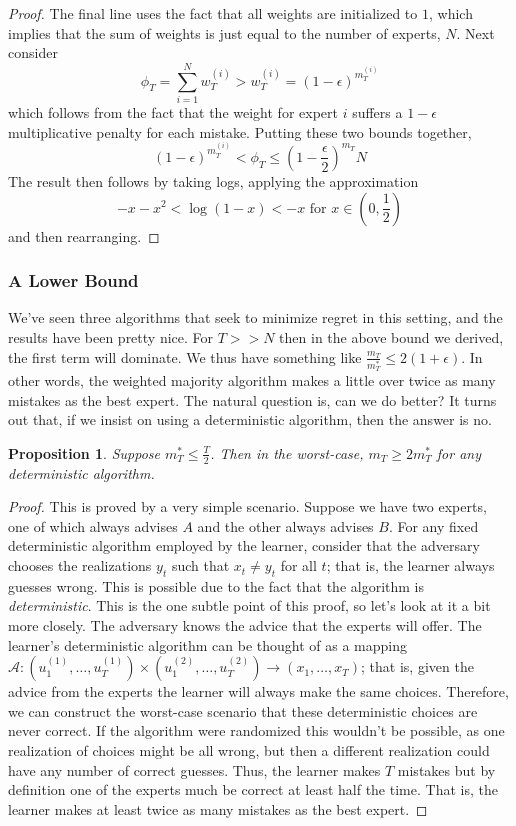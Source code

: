 \documentclass[12pt]{article}
\newtheorem{prop}{Proposition}
\begin{document}
\begin{proof}
The final line uses the fact that all weights are initialized to $1$, which implies that the sum of weights is
just equal to the number of experts, $N$. Next consider
\[\phi_T = \sum_{i = 1}^{N} w_T^{(i)} > w_T^{(i)} = (1 - \epsilon)^{m_T^{(i)}}\]
which follows from the fact that the weight for expert $i$ suffers a $1 - \epsilon$ multiplicative penalty for each mistake. Putting these two bounds together, 
\[(1 - \epsilon)^{m_T^{(i)}} < \phi_T \leq \left(1 - \frac{\epsilon}{2}\right)^{m_T}N\]
The result then follows by taking logs, applying the approximation 
\[-x - x^2 < \log(1 - x) < -x \text{ for } x \in \left(0, \frac{1}{2}\right)\]
and then rearranging. 
\end{proof}

\subsubsection{A Lower Bound}
We've seen three algorithms that seek to minimize regret in this setting, and the results have been pretty nice. For $T >> N$ then in the above bound we derived, the first term will dominate. We thus have 
something like $\frac{m_T}{m_T^*} \leq 2(1 + \epsilon)$. In other words, the weighted majority algorithm makes a little over twice as many mistakes as the best expert.
The natural question is, can we do better? It turns out that, if we insist on using a deterministic algorithm, then the answer is no. 
\begin{prop}
Suppose $m_T^* \leq \frac{T}{2}$. Then in the worst-case, $m_T \geq 2m_T^*$ for any deterministic algorithm. 
\end{prop} 

\begin{proof}
This is proved by a very simple scenario. Suppose we have two experts, one of which always advises $A$ and the other always advises $B$. For any fixed deterministic algorithm employed by the 
learner, consider that the adversary chooses the realizations $y_t$ such that $x_t \neq y_t$ for all $t$; that is, the learner always guesses wrong. This is possible due to the fact that the algorithm
is \textit{deterministic}. This is the one subtle point of this proof, so let's look at it a bit more closely. The adversary knows the advice that the experts will offer. The learner's deterministic algorithm 
can be thought of as a mapping $\mathcal{A}: (u_1^{(1)}, \dots, u_T^{(1)}) \times (u_1^{(2)}, \dots, u_T^{(2)}) \to (x_1, \dots, x_T)$; that is, given the advice from the experts the learner will 
always make the same choices. Therefore, we can construct the worst-case scenario that these deterministic choices are never correct. If the algorithm were randomized this wouldn't be possible,
as one realization of choices might be all wrong, but then a different realization could have any number of correct guesses. 
Thus, the learner makes $T$ mistakes but by definition one of the experts much be correct at least half the time. That is, the learner makes at least twice as many mistakes as the best expert.    
\end{proof}
\end{document}
